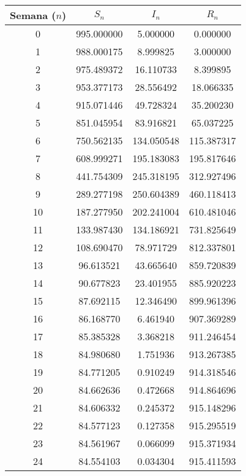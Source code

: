 \documentclass{article}
\begin{document}
\begin{table}[htpb]
\centering
\begin{minipage}{0.48\textwidth}\footnotesize
\centering
\begin{tabular}{|c|c|c|c|}
\hline
\textbf{Semana ($n$)} & \textbf{$S_n$} & \textbf{$I_n$} & \textbf{$R_n$} \\ \hline
0  & 995.000000 & 5.000000 & 0.000000 \\ \hline
1  & 988.000175 & 8.999825 & 3.000000 \\ \hline
2  & 975.489372 & 16.110733 & 8.399895 \\ \hline
3  & 953.377173 & 28.556492 & 18.066335 \\ \hline
4  & 915.071446 & 49.728324 & 35.200230 \\ \hline
5  & 851.045954 & 83.916821 & 65.037225 \\ \hline
6  & 750.562135 & 134.050548 & 115.387317 \\ \hline
7  & 608.999271 & 195.183083 & 195.817646 \\ \hline
8  & 441.754309 & 245.318195 & 312.927496 \\ \hline
9  & 289.277198 & 250.604389 & 460.118413 \\ \hline
10 & 187.277950 & 202.241004 & 610.481046 \\ \hline
11 & 133.987430 & 134.186921 & 731.825649 \\ \hline
12 & 108.690470 & 78.971729 & 812.337801 \\ \hline
13 & 96.613521  & 43.665640 & 859.720839 \\ \hline
14 & 90.677823  & 23.401955 & 885.920223 \\ \hline
15 & 87.692115  & 12.346490 & 899.961396 \\ \hline
16 & 86.168770  & 6.461940  & 907.369289 \\ \hline
17 & 85.385328  & 3.368218  & 911.246454 \\ \hline
18 & 84.980680  & 1.751936  & 913.267385 \\ \hline
19 & 84.771205  & 0.910249  & 914.318546 \\ \hline
20 & 84.662636  & 0.472668  & 914.864696 \\ \hline
21 & 84.606332  & 0.245372  & 915.148296 \\ \hline
22 & 84.577123  & 0.127358  & 915.295519 \\ \hline
23 & 84.561967  & 0.066099  & 915.371934 \\ \hline
24 & 84.554103  & 0.034304  & 915.411593 \\ \hline

\end{tabular}
\end{minipage}
\end{table}
\end{document}
